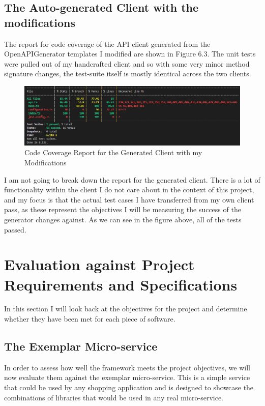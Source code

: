 \subsection{The Auto-generated Client with the modifications}
The report for code coverage of the API client generated from the OpenAPIGenerator templates I modified are shown in Figure 6.3. The unit tests were pulled out of my handcrafted client and so with some very minor method signature changes, the test-suite itself is mostly identical across the two clients.
\begin{figure}[!htb]
\caption{Code Coverage Report for the Generated Client with my Modifications}
\centering
\includegraphics[scale=0.55]{FYP_Dissertation_template/Figures/modified-client-code-coverage.PNG}
\end{figure}
\FloatBarrier
I am not going to break down the report for the generated client. There is a lot of functionality within the client I do not care about in the context of this project, and my focus is that the actual test cases I have transferred from my own client pass, as these represent the objectives I will be measuring the success of the generator changes against. As we can see in the figure above, all of the tests passed.
\section{Evaluation against Project Requirements and Specifications}
In this section I will look back at the objectives for the project and determine whether they have been met for each piece of software.
\subsection{The Exemplar Micro-service}
In order to assess how well the framework meets the project objectives, we will now evaluate them against the exemplar micro-service. This is a simple service that could be used by any shopping application and is designed to showcase the combinations of libraries that would be used in any real micro-service.
